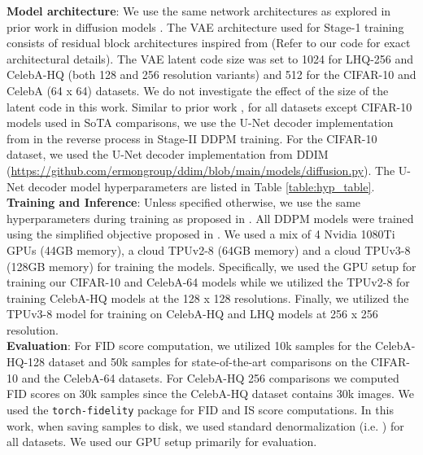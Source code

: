 \documentclass[10pt]{article} \usepackage[accepted]{tmlr}
\begin{document}
\noindent
\textbf{Model architecture}: We use the same network architectures as explored in prior work in diffusion models \citep{ho2020denoising, dhariwal2021diffusion, nichol2021improved}. The VAE architecture used for Stage-1 training consists of residual block architectures inspired from \citep{child2021deep} (Refer to our code for exact architectural details). The VAE latent code size was set to 1024 for LHQ-256 and CelebA-HQ (both 128 and 256 resolution variants) and 512 for the CIFAR-10 and CelebA (64 x 64) datasets. We do not investigate the effect of the size of the latent code in this work. Similar to prior work \citep{ho2020denoising}, for all datasets except CIFAR-10 models used in SoTA comparisons, we use the U-Net \citep{ronneberger2015unet} decoder implementation from \citep{nichol2021improved} in the reverse process in Stage-II DDPM training. For the CIFAR-10 dataset, we used the U-Net decoder implementation from DDIM \citep{song2021denoising} (\url{https://github.com/ermongroup/ddim/blob/main/models/diffusion.py}). The U-Net decoder model hyperparameters are listed in Table \ref{table:hyp_table}.\\

\noindent
\textbf{Training and Inference}: Unless specified otherwise, we use the same hyperparameters during training as proposed in \citep{ho2020denoising}. All DDPM models were trained using the simplified objective proposed in \citep{ho2020denoising}. We used a mix of 4 Nvidia 1080Ti GPUs (44GB memory), a cloud TPUv2-8 (64GB memory) and a cloud TPUv3-8 (128GB memory) for training the models. Specifically, we used the GPU setup for training our CIFAR-10 and CelebA-64 models while we utilized the TPUv2-8 for training CelebA-HQ models at the 128 x 128 resolutions. Finally, we utilized the TPUv3-8 model for training on CelebA-HQ and LHQ models at 256 x 256 resolution.\\

\noindent
\textbf{Evaluation}: For FID \citep{heusel2018gans} score computation, we utilized 10k samples for the CelebA-HQ-128 dataset and 50k samples for state-of-the-art comparisons on the CIFAR-10 and the CelebA-64 datasets. For CelebA-HQ 256 comparisons we computed FID scores on 30k samples since the CelebA-HQ dataset contains 30k images. We used the \texttt{torch-fidelity} \citep{obukhov2020torchfidelity} package for FID and IS score computations. In this work, when saving samples to disk, we used standard denormalization (i.e. ) for all datasets. We used our GPU setup primarily for evaluation.
\end{document}
